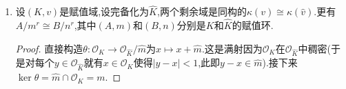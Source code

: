 \begin{enumerate}
\begin{proof}
    	反过来任取$(x_n)_n\in C$,取$x_n'$为$x_n\in A$的任一提升,那么$|x_n'-x_m'|\le|\pi^m|,n\ge m$.按照$|\pi|<1$得到$\{x_n'\}$是$A$中柯西列,记极限为$\varphi(x)$,那么$\varphi:C\to B$是同态.验证$\psi$和$\varphi$互为逆映射,得证.
    	
    	\qquad
    	
    	最后$K=B[\pi^{-1}]$是因为如果$x\in\widehat{K}$,可取一个足够大的$N$使得$v(x)+Nv(\pi)\ge0$,于是$\pi^Nx\in B$,于是有$x=\sum_{n\ge-N}s_n\pi^n$.
    \end{proof}
    \item 设$(K,v)$是赋值域,设完备化为$\widehat{K}$,两个剩余域是同构的$\kappa(v)\cong\kappa(\widehat{v})$.更有$A/m^r\cong B/n^r$,其中$(A,m)$和$(B,n)$分别是$K$和$\widehat{K}$的赋值环.
    \begin{proof}
    	
    	直接构造$\theta:\mathscr{O}_K\to\mathscr{O}_{\widehat{K}}/\widehat{m}$为$x\mapsto x+\widehat{m}$.这是满射因为$\mathscr{O}_K$在$\mathscr{O}_{\widehat{K}}$中稠密(于是对每个$y\in\mathscr{O}_{\widehat{K}}$就有$x\in\mathscr{O}_K$使得$|y-x|<1$,此即$y-x\in\widehat{m}$).接下来$\ker\theta=\widehat{m}\cap\mathscr{O}_K=m$.
    \end{proof}
\end{enumerate}






